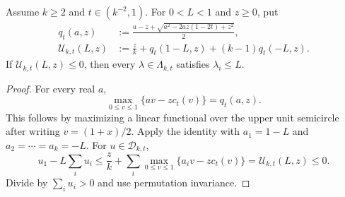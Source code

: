 \begin{lemma}
\label{lem:finite-k-scalar-certificate}
Assume $k\geq2$ and $t\in(k^{-2},1)$. For $0<L<1$ and $z\geq0$, put
\begin{align}
 q_t(a,z)&:=\frac{a-z+\sqrt{a^2-2az(1-2t)+z^2}}2,\\
 \mathcal U_{k,t}(L,z)
 &:=\frac zk+q_t(1-L,z)+(k-1)q_t(-L,z).
\end{align}
If $\mathcal U_{k,t}(L,z)\leq0$, then every
$\lambda\in\Lambda_{k,t}$ satisfies $\lambda_i\leq L$.
\end{lemma}

\begin{proof}
For every real $a$,
\begin{equation}
 \max_{0\leq v\leq1}\{av-zc_t(v)\}
 =q_t(a,z).
\end{equation}
This follows by maximizing a linear functional over the upper unit
semicircle after writing $v=(1+x)/2$. Apply the identity with
$a_1=1-L$ and $a_2=\cdots=a_k=-L$. For $u\in\mathscr D_{k,t}$,
\begin{equation}
 u_1-L\sum_i u_i
 \leq\frac zk+\sum_i\max_{0\leq v\leq1}\{a_iv-zc_t(v)\}
 =\mathcal U_{k,t}(L,z)\leq0.
\end{equation}
Divide by $\sum_i u_i>0$ and use permutation invariance.
\end{proof}

